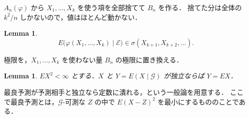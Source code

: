 \documentclass[a4paper,11pt,uplatex,dvipdfmx]{jsarticle}
\theoremstyle{plain}
\newtheorem{lemma}[theorem]{Lemma}
\theoremstyle{definition}
\begin{document}
$A_n(\varphi)$ から $X_1,\dots,X_k$ を使う項を全部捨てて $B_n$ を作る．
捨てた分は全体の $k^2/n$ しかないので，値はほとんど動かない．

\begin{lemma}\label{lem:tail}
\[
  E\bigl(\varphi(X_1,\dots,X_k)\mid\mathcal{E}\bigr)\in\sigma(X_{k+1},X_{k+2},\dots).
\]
\end{lemma}

極限を，$X_1,\dots,X_k$ を使わない量 $B_n$ の極限に置き換える．

\begin{lemma}\label{lem:independent-projection}
$EX^2<\infty$ とする．$X$ と $Y=E(X\mid\mathcal{G})$ が独立ならば $Y=EX$．
\end{lemma}

最良予測が予測相手と独立なら定数に潰れる，という一般論を用意する．
ここで最良予測とは，$\mathcal{G}$-可測な $Z$ の中で $E(X-Z)^2$ を最小にするもののことである．
\end{document}
